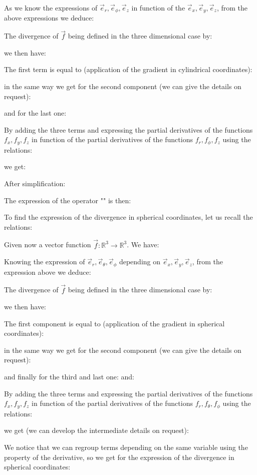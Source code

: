	As we know the expressions of $\vec{e}_r,\vec{e}_\phi,\vec{e}_z$ in function of the $\vec{e}_x,\vec{e}_y,\vec{e}_z$, from the above expressions we deduce:
	
	The divergence of $\vec{f}$ being defined in the three dimensional case by:
	
	we then have:
	
	The first term is equal to (application of the gradient in cylindrical coordinates):
	
	in the same way we get for the second component (we can give the details on request):
	
	and for the last one:
	
	By adding the three terms and expressing the partial derivatives of the functions $f_x,f_y,f_z$ in function of the partial derivatives of the functions $f_r,f_\phi,f_z$ using the relations:
	
	we get:
	
	After simplification:
	
	The expression of the operator "" is then:
	
	To find the expression of the divergence in spherical coordinates, let us recall the relations:
	
	Given now a vector function $\vec{f}:\mathbb{R}^3\rightarrow \mathbb{R}^3$. We have:
	
	Knowing the expression of $\vec{e}_r,\vec{e}_\theta,\vec{e}_\phi$ depending on $\vec{e}_x,\vec{e}_y,\vec{e}_z$, from the expression above we deduce:
	
	The divergence of $\vec{f}$ being defined in the three dimensional case by:
	
	we then have:
	
	The first component is equal to (application of the gradient in spherical coordinates):
	
	in the same way we get for the second component (we can give the details on request):
	
	and finally for the third and last one:
	and:
	
	By adding the three terms and expressing the partial derivatives of the functions $f_x,f_y,f_z$ in function of the partial derivatives of the functions $f_r,f_\theta,f_\phi$ using the relations:
	
	we get (we can develop the intermediate details on request):
	
	We notice that we can regroup terms depending on the same variable using the property of the derivative, so we get for the expression of the divergence in spherical coordinates:
	
